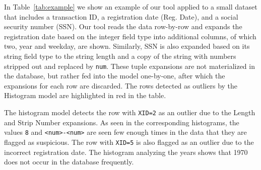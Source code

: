 In Table~\ref{tab:example} we show an example of our tool applied to a small dataset that includes a transaction ID, a registration date (Reg. Date), and a social security number (SSN).
Our tool reads the data row-by-row and expands the registration date based on the integer field type into additional columns, of which two, year and weekday, are shown.
Similarly, SSN is also expanded based on its string field type to the string length and a copy of the string with numbers stripped out and replaced by \texttt{num}.
These tuple expansions are not materialized in the database, but rather fed into the model one-by-one, after which the expansions for each row are discarded.
The rows detected as outliers by the Histogram model are highlighted in red in the table. 

\newcommand*{\boldtt}[1]{\fontfamily{pcr}\selectfont #1}

The histogram model detects the row with \texttt{XID=2} as an outlier due to the Length and Strip Number expansions.
As seen in the corresponding histograms, the values \texttt{8} and \texttt{<num>-<num>} are seen few enough times in the data that they are flagged as suspicious.
The row with \texttt{XID=5} is also flagged as an outlier due to the incorrect registration date.
The histogram analyzing the years shows that 1970 does not occur in the database frequently. 

